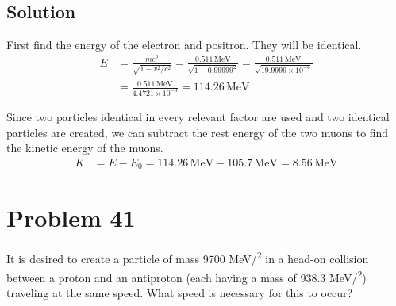 \documentclass[12pt]{article}
\newcommand{\E}[1]{\times 10^{#1}}
\begin{document}
    \subsection{Solution}
        First find the energy of the electron and positron.
        They will be identical.
        \begin{align}
            E   &=  \frac{mc^2}{\sqrt{1 - v^2/c^2}}
                =   \frac{0.511\,\unit{\mega\eV}}{\sqrt{1 - 0.99999^2}}
                =   \frac{0.511\,\unit{\mega\eV}}{\sqrt{19.9999\E{-6}}}\\
                &=  \frac{0.511\,\unit{\mega\eV}}{4.4721\E{-3}}
                =   114.26\,\unit{\mega\eV}
        \end{align}

        Since two particles identical in every relevant factor are used and two identical particles are created, we can subtract the rest energy of the two muons to find the kinetic energy of the muons.
        \begin{align}
            K   &=  E - E_0
                =   114.26\,\unit{\mega\eV} - 105.7\,\unit{\mega\eV}
                =   \boxed{8.56\,\unit{\mega\eV}}
        \end{align}
    \pagebreak

\section{Problem 41}
    It is desired to create a particle of mass 9700 \unit{\mega\eV/\light^2} in a head-on collision between a proton and an antiproton (each having a mass of 938.3 \unit{\mega\eV/\light^2}) traveling at the same speed.
    What speed is necessary for this to occur?
\end{document}
